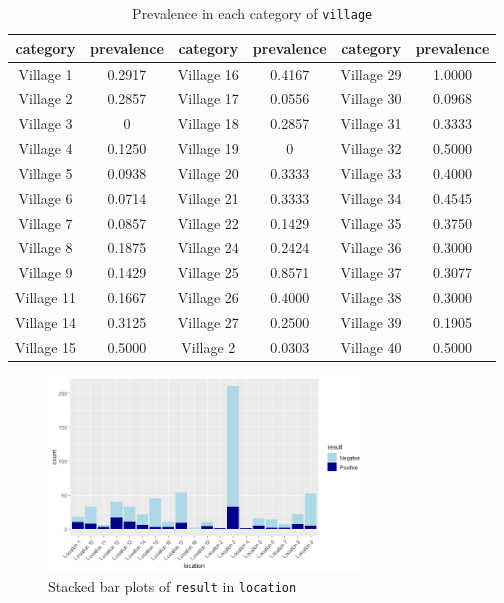 \documentclass[11pt,twoside]{article}
\numberwithin{Theorem}{section}
\numberwithin{Definition}{section}
\numberwithin{Lemma}{section}
\numberwithin{Algorithm}{section}
\numberwithin{equation}{section}
\begin{document}
\begin{table}[!h]
	\centering
	\begin{tabular}{|c|c|c|c|c|c|}
		\hline
		category & prevalence & category & prevalence & category & prevalence \\
		\hline
		Village 1 & 0.2917 & Village 16 & 0.4167 & Village 29 & 1.0000 \\
		Village 2 & 0.2857 & Village 17 & 0.0556 & Village 30 & 0.0968 \\
		Village 3 & 0 & Village 18 & 0.2857 & Village 31 & 0.3333 \\
		Village 4 & 0.1250 & Village 19 & 0 & Village 32 & 0.5000 \\
		Village 5 & 0.0938 & Village 20 & 0.3333 & Village 33 & 0.4000 \\
		Village 6 & 0.0714 & Village 21 & 0.3333 & Village 34 & 0.4545 \\
		Village 7 & 0.0857 & Village 22 & 0.1429 & Village 35 & 0.3750 \\
		Village 8 & 0.1875 & Village 24 & 0.2424 & Village 36 & 0.3000 \\		
		Village 9 & 0.1429 & Village 25 & 0.8571 & Village 37 & 0.3077 \\
		Village 11 & 0.1667 & Village 26 & 0.4000 & Village 38 & 0.3000 \\
		Village 14 & 0.3125 & Village 27 & 0.2500 &	Village 39 & 0.1905 \\
		Village 15 & 0.5000 & Village 2 & 0.0303 & Village 40 & 0.5000	\\
		\hline			
	\end{tabular}
	\caption{Prevalence in each category of \texttt{village}}
	\label{tab:village}
\end{table}

\begin{figure}[!h]
	\centering
	\includegraphics[width = 0.75\textwidth]{Images/location.png}
	\caption{Stacked bar plots of \texttt{result} in \texttt{location}}
	\label{fig:location}
\end{figure}
\end{document}
